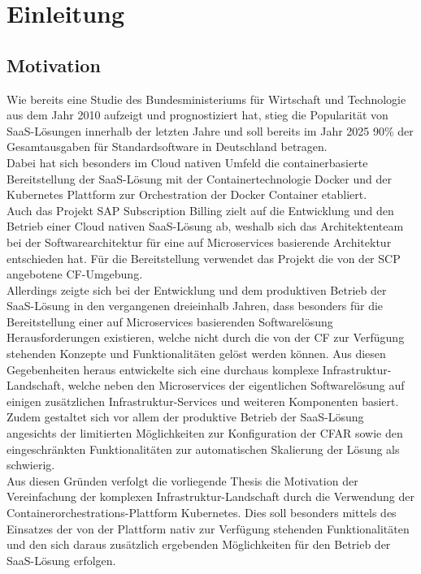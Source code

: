 \chapter{Einleitung}
\section{Motivation}
Wie bereits eine Studie des Bundesministeriums für Wirtschaft und
Technologie aus dem Jahr 2010 aufzeigt und prognostiziert hat, stieg die Popularität von \ac{SaaS}-Lösungen innerhalb der letzten Jahre und soll bereits im Jahr 2025 90\% der Gesamtausgaben für Standardsoftware in Deutschland betragen.\autocite[Vgl.][S. 58]{Dufft.2010}\\
Dabei hat sich besonders im Cloud nativen Umfeld die containerbasierte Bereitstellung der \ac{SaaS}-Lösung mit der Containertechnologie Docker und der Kubernetes Plattform zur Orchestration der Docker Container etabliert.\\
Auch das Projekt SAP Subscription Billing zielt auf die Entwicklung und den Betrieb einer Cloud nativen \ac{SaaS}-Lösung ab, weshalb sich das Architektenteam bei der Softwarearchitektur für eine auf Microservices basierende Architektur entschieden hat. Für die Bereitstellung verwendet das Projekt die von der \ac{SCP} angebotene \ac{CF}-Umgebung.\\ 
Allerdings zeigte sich bei der Entwicklung und dem produktiven Betrieb der \ac{SaaS}-Lösung in den vergangenen dreieinhalb Jahren, dass besonders für die Bereitstellung einer auf Microservices basierenden Softwarelösung Herausforderungen existieren, welche nicht durch die von der \ac{CF} zur Verfügung stehenden Konzepte und Funktionalitäten gelöst werden können. Aus diesen Gegebenheiten heraus entwickelte sich eine durchaus komplexe Infrastruktur-Landschaft, welche neben den Microservices der eigentlichen Softwarelösung auf einigen zusätzlichen Infrastruktur-Services und weiteren Komponenten basiert.\\
Zudem gestaltet sich vor allem der produktive Betrieb der \ac{SaaS}-Lösung angesichts der limitierten Möglichkeiten zur Konfiguration der \ac{CFAR} sowie den eingeschränkten Funktionalitäten zur automatischen Skalierung der Lösung als schwierig.\\
Aus diesen Gründen verfolgt die vorliegende Thesis die Motivation der Vereinfachung der komplexen Infrastruktur-Landschaft durch die Verwendung der Containerorchestrations-Plattform Kubernetes.
Dies soll besonders mittels des Einsatzes der von der Plattform nativ zur Verfügung stehenden Funktionalitäten und den sich daraus zusätzlich ergebenden Möglichkeiten für den Betrieb der \ac{SaaS}-Lösung erfolgen. 


